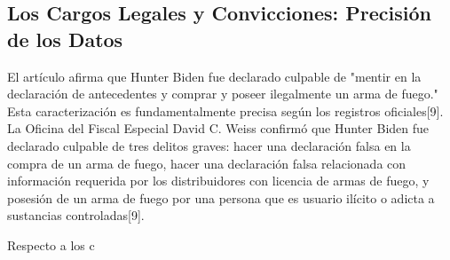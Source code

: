 \documentclass[10pt,a4paper]{article}
\begin{document}
\subsection*{Los Cargos Legales y Convicciones: Precisi\'{o}n de los Datos}

 El art\'{i}culo afirma que Hunter Biden fue declarado culpable de "mentir en la declaraci\'{o}n de antecedentes y comprar y poseer ilegalmente un arma de fuego." Esta caracterizaci\'{o}n es fundamentalmente precisa seg\'{u}n los registros oficiales[9]. La Oficina del Fiscal Especial David C. Weiss confirm\'{o} que Hunter Biden fue declarado culpable de tres delitos graves: hacer una declaraci\'{o}n falsa en la compra de un arma de fuego, hacer una declaraci\'{o}n falsa relacionada con informaci\'{o}n requerida por los distribuidores con licencia de armas de fuego, y posesi\'{o}n de un arma de fuego por una persona que es usuario il\'{i}cito o adicta a sustancias controladas[9].
\par\medskip
Respecto a los c
\vspace{1em}

\end{document}
